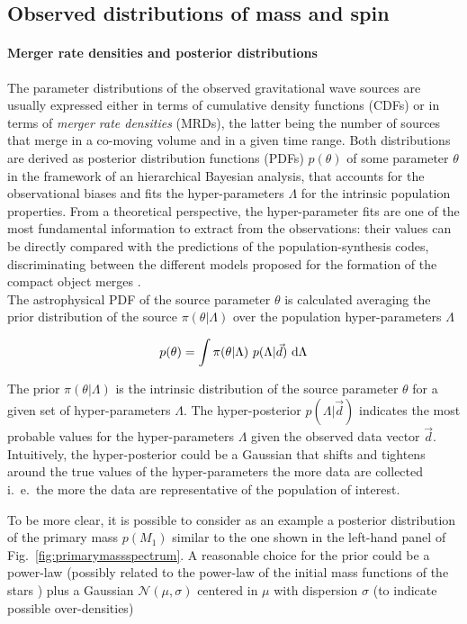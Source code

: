 \documentclass[a4paper,titlepage]{book}     	%
\begin{document}
\subsection{Observed distributions of mass and spin}\label{subsec:GWmassspin}

\paragraph{Merger rate densities and posterior distributions}
The parameter distributions of the observed gravitational wave sources are usually expressed either in terms of cumulative density functions (CDFs) or in terms of \emph{merger rate densities} (MRDs), the latter being the number of sources that merge in a co-moving volume and in a given time range. Both distributions are derived as posterior distribution functions (PDFs) $p(\theta)$ of some parameter $\theta$ in the framework of an hierarchical Bayesian analysis, that accounts for the observational biases and fits the hyper-parameters $\Lambda$ for the intrinsic population properties. From a theoretical perspective, the hyper-parameter fits are one of the most fundamental information to extract from the observations: their values can be directly compared with the predictions of the population-synthesis codes, discriminating between the different models proposed for the formation of the compact object merges \cite{GWTC-3_interpretation, BayesforGW}. \\

The astrophysical PDF of the source parameter $\theta$ is calculated averaging the prior distribution of the source $\pi(\theta|\Lambda)$ over the population hyper-parameters $\Lambda$ 

\begin{equation}\label{eq:posteriorMRD}
    p(\theta) = \int \pi(\theta|\Lambda)~p(\Lambda|\vec{d})~\rm d \Lambda
\end{equation}

The prior $\pi(\theta|\Lambda)$ is the intrinsic distribution of the source parameter $\theta$ for a given set of hyper-parameters $\Lambda$. The hyper-posterior $p(\Lambda|\vec{d})$ indicates the most probable values for the hyper-parameters $\Lambda$ given the observed data vector $\vec{d}$. Intuitively, the hyper-posterior could be a Gaussian that shifts and tightens around the true values of the hyper-parameters the more data are collected i.\ e.\ the more the data are representative of the population of interest.

To be more clear, it is possible to consider as an example a posterior distribution of the primary mass $p(M_1)$ similar to the one shown in the left-hand panel of Fig.\ \ref{fig:primarymassspectrum}. A reasonable choice for the prior could be a power-law (possibly related to the power-law of the initial mass functions of the stars \cite{Kroupa2001}) plus a Gaussian $\mathcal{N} (\mu,\sigma)$ centered in $\mu$ with dispersion $\sigma$ (to indicate possible over-densities) %
\end{document}
